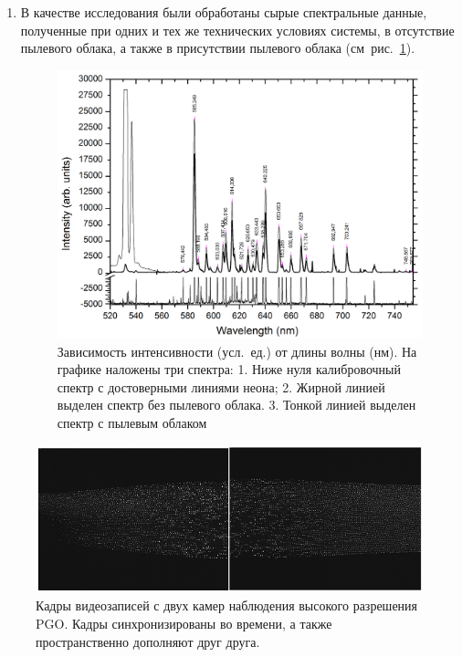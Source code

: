 \begin{enumerate}
    \item В качестве исследования были обработаны сырые спектральные данные, полученные при одних и тех же
    технических условиях системы, в отсутствие пылевого облака, а также в присутствии пылевого облака (см~рис.~\ref{fig:fig34}).
    \begin{figure}
        \centering
        \includegraphics[width=15cm]{figures/fig34}
        \caption{
            Зависимость интенсивности (усл.~ед.) от длины волны (нм). На графике наложены три спектра:
            1. Ниже нуля калибровочный спектр с достоверными линиями неона;
            2. Жирной линией выделен спектр без пылевого облака.
            3. Тонкой линией выделен спектр с пылевым облаком
        }
        \label{fig:fig34}
    \end{figure}
\end{enumerate}

\begin{figure}[t]
  \centering
  \includegraphics[width=12cm]{figures/fig32}
  \caption{Кадры видеозаписей с двух камер наблюдения высокого разрешения PGO. Кадры синхронизированы во времени, а также пространственно дополняют друг друга.}
  \label{fig:fig32}
\end{figure}


